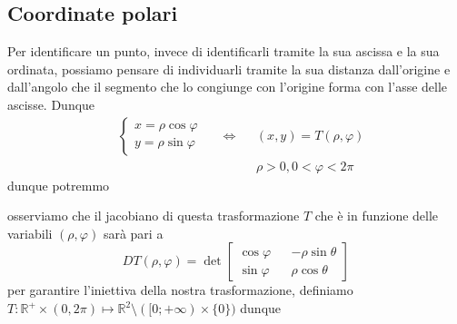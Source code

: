\subsection{Coordinate polari}
Per identificare un punto, invece di identificarli tramite la sua ascissa e la sua ordinata, possiamo pensare di individuarli tramite la sua distanza dall'origine e dall'angolo che il segmento che lo congiunge con
l'origine forma con l'asse delle ascisse. Dunque
\begin{align*}
&\begin{cases}
	x = \rho \cos{\varphi} \\
	y = \rho \sin{\varphi}
\end{cases} & &\iff & &(x, y) = T(\rho, \varphi) \\
& & & & &\rho > 0, 0 < \varphi < 2\pi
\end{align*}
dunque potremmo 
\begin{figure}[H]
	\centering
\end{figure}
osserviamo che il jacobiano di questa trasformazione $T$ che è in funzione delle variabili $(\rho, \varphi)$ sarà pari a
$$
DT(\rho, \varphi) = \det \begin{bmatrix} \cos{\varphi} && -\rho \sin{\theta} \\
	\sin{\varphi} && \rho \cos{\theta}
\end{bmatrix} 
$$
per garantire l'iniettiva della nostra trasformazione, definiamo $T: \mathbb{R}^+ \times (0, 2\pi) \mapsto \mathbb{R}^2 \setminus ([0; +\infty) \times \{0\})$ dunque
\begin{figure}[H]
	\centering
\end{figure}
